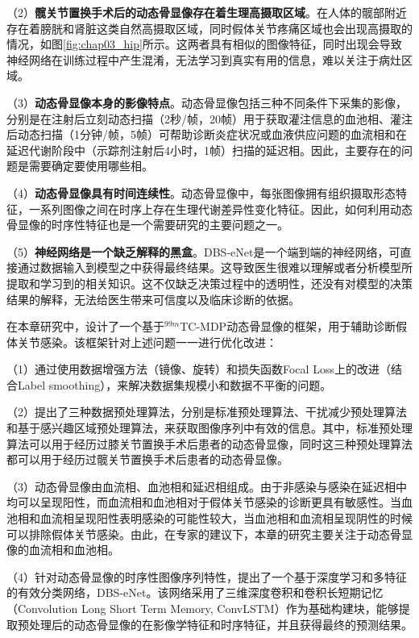 （2）\textbf{髋关节置换手术后的动态骨显像存在着生理高摄取区域}。在人体的髋部附近存在着膀胱和肾脏这类自然高摄取区域，同时假体关节疼痛区域也会出现高摄取的情况，如图\ref{fig:chap03_hip}所示。这两者具有相似的图像特征，同时出现会导致神经网络在训练过程中产生混淆，无法学习到真实有用的信息，难以关注于病灶区域。

（3）\textbf{动态骨显像本身的影像特点}。动态骨显像包括三种不同条件下采集的影像，分别是在注射后立刻动态扫描（2秒/帧，20帧）用于获取灌注信息的血池相、灌注后动态扫描（1分钟/帧，5帧）可帮助诊断炎症状况或血液供应问题的血流相\cite{schauwecker1992scintigraphic}和在延迟代谢阶段中（示踪剂注射后4小时，1帧）扫描的延迟相。因此，主要存在的问题是需要确定要使用哪些相。

（4）\textbf{动态骨显像具有时间连续性}。动态骨显像中，每张图像拥有组织摄取形态特征，一系列图像之间在时序上存在生理代谢差异性变化特征。因此，如何利用动态骨显像的时序性特征也是一个需要研究的主要问题之一。

（5）\textbf{神经网络是一个缺乏解释的黑盒}。DBS-eNet是一个端到端的神经网络，可直接通过数据输入到模型之中获得最终结果。这导致医生很难以理解或者分析模型所提取和学习到的相关知识。这不仅缺乏决策过程中的透明性，还没有对模型的决策结果的解释，无法给医生带来可信度以及临床诊断的依据。

在本章研究中，设计了一个基于\(^{99m}\)TC-MDP动态骨显像的框架，用于辅助诊断假体关节感染。该框架针对上述问题一一进行优化改进：

（1）通过使用数据增强方法（镜像、旋转）和损失函数Focal Loss\cite{lin2017focal}上的改进（结合Label smoothing\cite{zhang2021delving}），来解决数据集规模小和数据不平衡的问题。

（2）提出了三种数据预处理算法，分别是标准预处理算法、干扰减少预处理算法和基于感兴趣区域预处理算法，来获取图像序列中有效的信息。其中，标准预处理算法可以用于经历过膝关节置换手术后患者的动态骨显像，同时这三种预处理算法都可以用于经历过髋关节置换手术后患者的动态骨显像。

（3）动态骨显像由血流相、血池相和延迟相组成。由于非感染与感染在延迟相中均可以呈现阳性，而血流相和血池相对于假体关节感染的诊断更具有敏感性。当血池相和血流相呈现阳性表明感染的可能性较大，当血池相和血流相呈现阴性的时候可以排除假体关节感染。由此，在专家的建议下，本章的研究主要关注于动态骨显像的血流相和血池相。

（4）针对动态骨显像的时序性图像序列特性，提出了一个基于深度学习和多特征的有效分类网络，DBS-eNet。该网络采用了三维深度卷积和卷积长短期记忆（Convolution Long Short Term Memory, ConvLSTM）\cite{shi2015convolutional}作为基础构建块，能够提取预处理后的动态骨显像的在影像学特征和时序特征，并且获得最终的预测结果。


